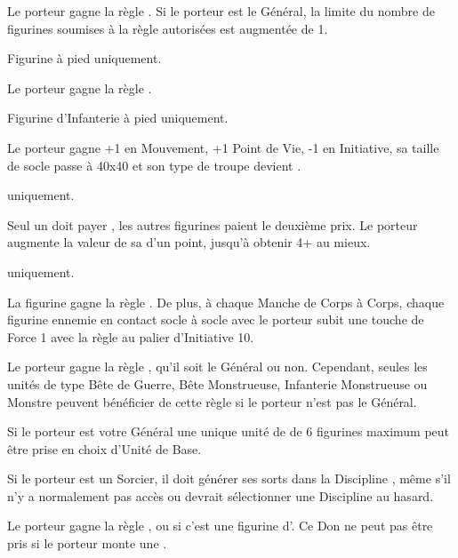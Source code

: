 \begin{multicols}{2}\raggedcolumns

\startpricelistNSP

 Le porteur gagne la règle \terror{}. Si le porteur est le Général, la limite du nombre de figurines soumises à la règle \survivalofthefittest{} autorisées est augmentée de 1.

 Figurine à pied uniquement.

Le porteur gagne la règle .

 Figurine d'Infanterie à pied uniquement.

Le porteur gagne +1 en Mouvement, +1 Point de Vie, -1 en Initiative, sa taille de socle passe à \unit{40x40}{\milli\meter} et son type de troupe devient \monstrousinfantry{}.

\textbf{\dchange} uniquement.

 Seul un \daemonprince{} doit payer , les autres figurines paient le deuxième prix.\newline
Le porteur augmente la valeur de sa \wardsave{} d'un point, jusqu'à obtenir 4+ au mieux.

 \textbf{\pestilence} uniquement.

La figurine gagne la règle \breathweapon{\toxicattacks}. De plus, à chaque Manche de Corps à Corps, chaque figurine ennemie en contact socle à socle avec le porteur subit une touche de Force 1 avec la règle  au palier d'Initiative 10.

\columnbreak
{} Le porteur gagne la règle \inspiringpresence{}, qu'il soit le Général ou non. Cependant, seules les unités de type Bête de Guerre, Bête Monstrueuse, Infanterie Monstrueuse ou Monstre peuvent bénéficier de cette règle si le porteur n'est pas le Général.

Si le porteur est votre Général une unique unité de \wastelandtrolls{} de 6 figurines maximum peut être prise en choix d'Unité de Base.

Si le porteur est un Sorcier, il doit générer ses sorts dans la Discipline \wilderness{}, même s'il n'y a normalement pas accès ou devrait sélectionner une Discipline au hasard.

 Le porteur gagne la règle , ou  si c'est une figurine d'\infantry{}. Ce Don ne peut pas être pris si le porteur monte une \manticore{}.


\end{multicols}
